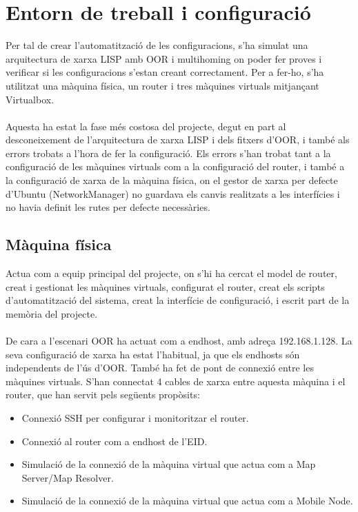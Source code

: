 \documentclass[11pt]{article}
\begin{document}
\section{Entorn de treball i configuració}
Per tal de crear l’automatització de les configuracions, s’ha simulat una arquitectura de xarxa LISP amb OOR i multihoming on poder fer proves i verificar si les configuracions s’estan creant correctament. Per a fer-ho, s’ha utilitzat una màquina física, un router i tres màquines virtuals mitjançant Virtualbox.\\
\\
Aquesta ha estat la fase més costosa del projecte, degut en part al desconeixement de l’arquitectura de xarxa LISP i dels fitxers d’OOR, i també als errors trobats a l’hora de fer la configuració. Els errors s’han trobat tant a la configuració de les màquines virtuals com a la configuració del router, i també a la configuració de xarxa de la màquina física, on el gestor de xarxa per defecte d’Ubuntu (NetworkManager) no guardava els canvis realitzats a les interfícies i no havia definit les rutes per defecte necessàries.

\subsection{Màquina física}
Actua com a equip principal del projecte, on s’hi ha cercat el model de router, creat i gestionat les màquines virtuals, configurat el router, creat els scripts d’automatització del sistema, creat la interfície de configuració, i escrit part de la memòria del projecte.\\
\\
De cara a l’escenari OOR ha actuat com a endhost, amb adreça 192.168.1.128. La seva configuració de xarxa ha estat l’habitual, ja que els endhosts són independents de l’ús d’OOR.
També ha fet de pont de connexió entre les màquines virtuals. S’han connectat 4 cables de xarxa entre aquesta màquina i el router, que han servit pels següents propòsits:
\begin{itemize}
\item Connexió SSH per configurar i monitoritzar el router.
\item Connexió al router com a endhost de l’EID.
\item Simulació de la connexió de la màquina virtual que actua com a Map Server/Map Resolver.
\item Simulació de la connexió de la màquina virtual que actua com a Mobile Node.
\end{itemize}
\end{document}
